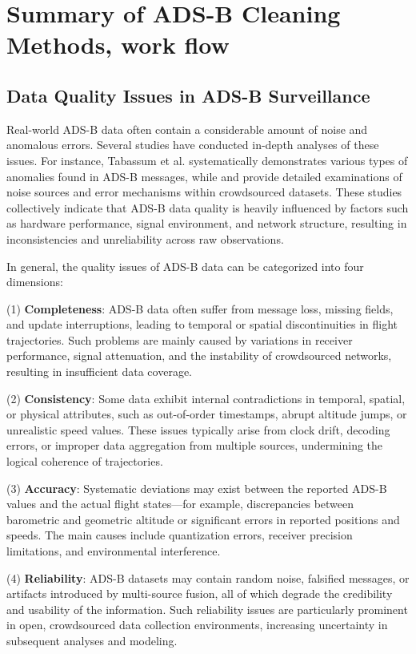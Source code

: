 \section{Summary of ADS-B Cleaning Methods, work flow}\label{clean}

\subsection {Data Quality Issues in ADS-B Surveillance}

Real-world ADS-B data often contain a considerable amount of noise and anomalous errors. Several studies have conducted in-depth analyses of these issues. For instance, Tabassum et al. \cite{8102001} systematically demonstrates various types of anomalies found in ADS-B messages, while \cite{8569833} and \cite{Olive_Krummen_Figuet_Alligier_2025} provide detailed examinations of noise sources and error mechanisms within crowdsourced datasets. These studies collectively indicate that ADS-B data quality is heavily influenced by factors such as hardware performance, signal environment, and network structure, resulting in inconsistencies and unreliability across raw observations.

In general, the quality issues of ADS-B data can be categorized into four dimensions:

(1) \textbf{Completeness}: ADS-B data often suffer from message loss, missing fields, and update interruptions, leading to temporal or spatial discontinuities in flight trajectories. Such problems are mainly caused by variations in receiver performance, signal attenuation, and the instability of crowdsourced networks, resulting in insufficient data coverage.

(2) \textbf{Consistency}: Some data exhibit internal contradictions in temporal, spatial, or physical attributes, such as out-of-order timestamps, abrupt altitude jumps, or unrealistic speed values. These issues typically arise from clock drift, decoding errors, or improper data aggregation from multiple sources, undermining the logical coherence of trajectories.

(3) \textbf{Accuracy}: Systematic deviations may exist between the reported ADS-B values and the actual flight states—for example, discrepancies between barometric and geometric altitude or significant errors in reported positions and speeds. The main causes include quantization errors, receiver precision limitations, and environmental interference.

(4) \textbf{Reliability}: ADS-B datasets may contain random noise, falsified messages, or artifacts introduced by multi-source fusion, all of which degrade the credibility and usability of the information. Such reliability issues are particularly prominent in open, crowdsourced data collection environments, increasing uncertainty in subsequent analyses and modeling.


